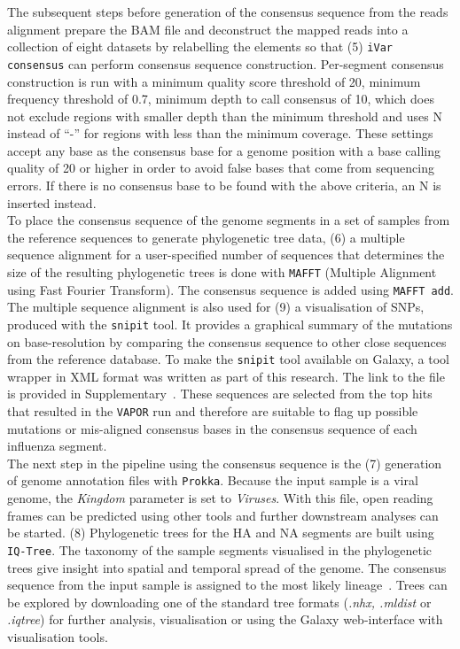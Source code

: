 The subsequent steps before generation of the consensus sequence from the reads alignment prepare the \ac{BAM} file and deconstruct the mapped reads into a collection of eight datasets by relabelling the elements so that (5) \texttt{iVar consensus} can perform consensus sequence construction. Per-segment consensus construction is run with a minimum quality score threshold of 20, minimum frequency threshold of 0.7, minimum depth to call consensus of 10, which does not exclude regions with smaller depth than the minimum threshold and uses N instead of ``-'' for regions with less than the minimum coverage. These settings accept any base as the consensus base for a genome position with a base calling quality of 20 or higher in order to avoid false bases that come from sequencing errors. If there is no consensus base to be found with the above criteria, an N is inserted instead. \\
To place the consensus sequence of the genome segments in a set of samples from the reference sequences to generate phylogenetic tree data, (6) a multiple sequence alignment for a user-specified number of sequences that determines the size of the resulting phylogenetic trees is done with \texttt{MAFFT} (Multiple Alignment using Fast Fourier Transform). The consensus sequence is added using \texttt{MAFFT add}. The multiple sequence alignment is also used for (9) a visualisation of SNPs, produced with the \texttt{snipit} tool. It provides a graphical summary of the mutations on base-resolution by comparing the consensus sequence to other close sequences from the reference database. To make the \texttt{snipit} tool available on Galaxy, a tool wrapper in XML format was written as part of this research. The link to the file is provided in Supplementary~. These sequences are selected from the top hits that resulted in the \texttt{VAPOR} run and therefore are suitable to flag up possible mutations or mis-aligned consensus bases in the consensus sequence of each influenza segment. \\
The next step in the pipeline using the consensus sequence is the (7) generation of genome annotation files with \texttt{Prokka}. Because the input sample is a viral genome, the \textit{Kingdom} parameter is set to \textit{Viruses}. With this file, open reading frames can be predicted using other tools and further downstream analyses can be started. (8) Phylogenetic trees for the \ac{HA} and \ac{NA} segments are built using \texttt{IQ-Tree}. The taxonomy of the sample segments visualised in the phylogenetic trees give insight into spatial and temporal spread of the genome. The consensus sequence from the input sample is assigned to the most likely lineage~\cite{minh2020iq}. Trees can be explored by downloading one of the standard tree formats (\textit{.nhx, .mldist} or \textit{.iqtree}) for further analysis, visualisation or using the Galaxy web-interface with visualisation tools. \\

